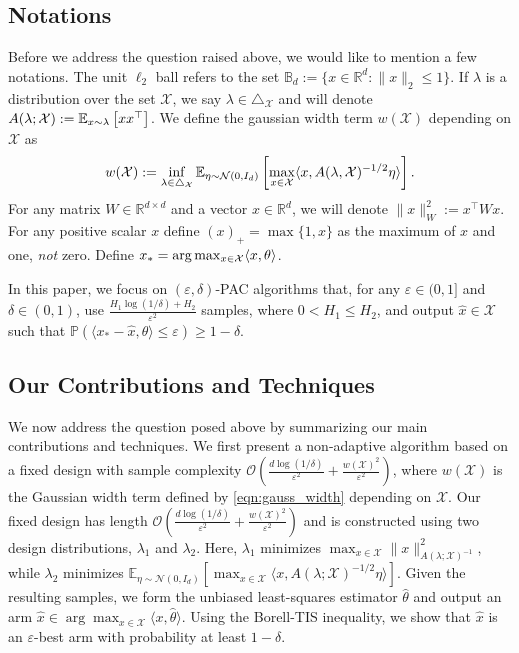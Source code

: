 \subsection{Notations}
Before we address the question raised above, we would like to mention a few notations. The unit $\ell_2$ ball refers to the set $\mathbb{B}_d := \{x \in \mathbb{R}^d : \|x\|_2 \le 1\}$.  If $\lambda$ is a distribution over the set $\mathcal{X}$, we say $\lambda \in \triangle_{\mathcal{X}}$ and will denote $A(\lambda; \mathcal{X}) := \mathbb{E}_{x\sim\lambda}\left[x x^\top\right]$. We define the gaussian width term $w(\mathcal{X})$ depending on $\mathcal{X}$ as 
\begin{align}
    w(\mathcal{X}):=\inf_{\lambda \in \triangle_{\mathcal{X}}}\mathbb{E}_{\eta\sim\mathcal{N}(0,I_d)}\left[\max_{x\in\mathcal{X}}\langle x,A(\lambda,\mathcal{X})^{-1/2}\eta \rangle\right]. \label{eqn:gauss_width}
\end{align}
For any matrix $W\in \mathbb{R}^{d\times d}$ and a vector $x\in\mathbb{R}^d$, we will denote $\|x\|_W^2 := x^\top W x$. 
For any positive scalar $x$ define $(x)_+ = \max\{1,x\}$ as the maximum of $x$ and one, \emph{not} zero.
Define $x_* = \arg\max_{x \in \mathcal{X}} \langle x ,\theta \rangle$.

In this paper, we focus on $(\varepsilon,\delta)$-PAC algorithms that, for any $\varepsilon\in(0,1]$ and $\delta\in(0,1)$, use $\frac{H_1\log(1/\delta)+H_2}{\varepsilon^2}$ samples, where $0<H_1\leq H_2$, and output $\hat{x}\in\mathcal{X}$ such that $\mathbb{P}(\langle x_*-\hat{x},\theta\rangle \le \varepsilon) \ge 1-\delta$.
\subsection{Our Contributions and Techniques}
We now address the question posed above by summarizing our main contributions and techniques. We first present a non-adaptive algorithm based on a fixed design with sample complexity $\mathcal{O}\!\left(\frac{d\log(1/\delta)}{\varepsilon^2}+\frac{w(\mathcal{X})^2}{\varepsilon^2}\right)$, where $w(\mathcal{X})$ is the Gaussian width term defined by \eqref{eqn:gauss_width} depending on $\mathcal{X}$. Our fixed design has length $\mathcal{O}\!\left(\frac{d\log(1/\delta)}{\varepsilon^2}+\frac{w(\mathcal{X})^2}{\varepsilon^2}\right)$ and is constructed using two design distributions, $\lambda_1$ and $\lambda_2$. Here, $\lambda_1$ minimizes $\max_{x\in\mathcal{X}}\|x\|^2_{A(\lambda;\mathcal{X})^{-1}}$, while $\lambda_2$ minimizes $\mathbb{E}_{\eta\sim\mathcal{N}(0,I_d)}\!\left[\max_{x\in\mathcal{X}}\big\langle x, A(\lambda;\mathcal{X})^{-1/2}\eta\big\rangle\right]$. Given the resulting samples, we form the unbiased least-squares estimator $\widehat{\theta}$ and output an arm $\widehat{x}\in\arg\max_{x\in\mathcal{X}}\langle x,\widehat{\theta}\rangle$. Using the Borell-TIS inequality, we show that $\widehat{x}$ is an $\varepsilon$-best arm with probability at least $1-\delta$.

